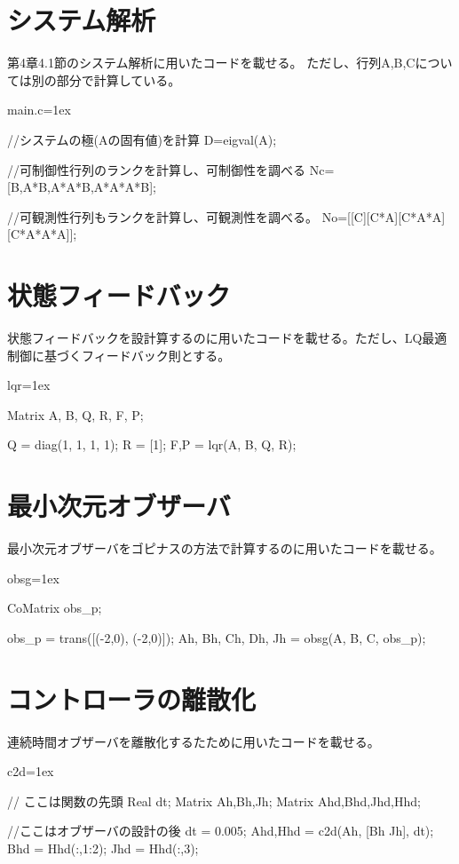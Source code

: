 \section{システム解析}
	第4章4.1節のシステム解析に用いたコードを載せる。
	ただし、行列A,B,Cについては別の部分で計算している。
	\begin{breakitembox}[l]{main.c}\baselineskip=1ex
		\begin{verbatimtab}[4]
//システムの極(Aの固有値)を計算
D=eigval(A);

//可制御性行列のランクを計算し、可制御性を調べる
Nc=[B,A*B,A*A*B,A*A*A*B];

//可観測性行列もランクを計算し、可観測性を調べる。
No=[[C][C*A][C*A*A][C*A*A*A]];
		\end{verbatimtab}
	\end{breakitembox}
\section{状態フィードバック}
	状態フィードバックを設計算するのに用いたコードを載せる。ただし、LQ最適制御に基づくフィードバック則とする。
	\begin{breakitembox}[l]{lqr}\baselineskip=1ex
		\begin{verbatimtab}[4]
Matrix A, B, Q, R, F, P;

Q = diag(1, 1, 1, 1);
R = [1];
{F,P} = lqr(A, B, Q, R);
		\end{verbatimtab}
	\end{breakitembox}
\section{最小次元オブザーバ}
	最小次元オブザーバをゴピナスの方法で計算するのに用いたコードを載せる。
	\begin{breakitembox}[l]{obsg}\baselineskip=1ex
		\begin{verbatimtab}[4]
CoMatrix obs_p;

obs_p = trans([(-2,0), (-2,0)]);
{Ah, Bh, Ch, Dh, Jh} = obsg(A, B, C, obs_p);
		\end{verbatimtab}
	\end{breakitembox}
\section{コントローラの離散化}
	連続時間オブザーバを離散化するたために用いたコードを載せる。
	\begin{breakitembox}[l]{c2d}\baselineskip=1ex
		\begin{verbatimtab}[4]
// ここは関数の先頭
Real dt;
Matrix Ah,Bh,Jh;
Matrix Ahd,Bhd,Jhd,Hhd;

//ここはオブザーバの設計の後
dt = 0.005;
{Ahd,Hhd} = c2d(Ah, [Bh Jh], dt);
Bhd = Hhd(:,1:2);
Jhd = Hhd(:,3);
		\end{verbatimtab}
	\end{breakitembox}
